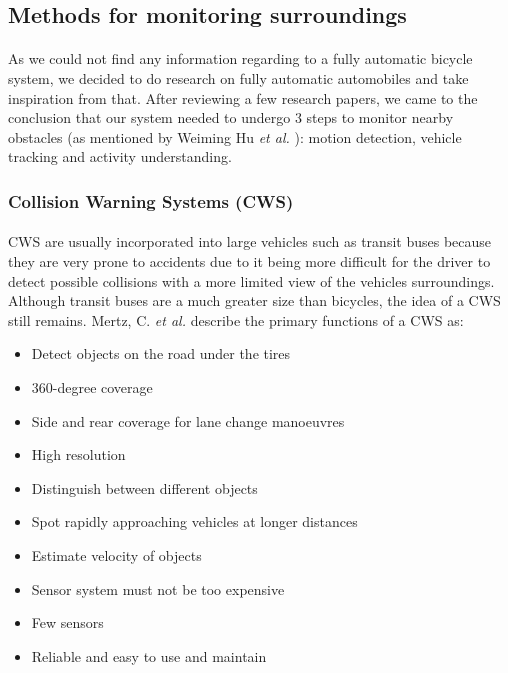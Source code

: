 \documentclass[a4paper]{report}
\begin{document}
\subsection{Methods for monitoring surroundings}
\paragraph{} As we could not find any information regarding to a fully automatic bicycle system, we decided to do research on fully automatic automobiles and take inspiration from that. After reviewing a few research papers, we came to the conclusion that our system needed to undergo 3 steps to monitor nearby obstacles (as mentioned by Weiming Hu \textit{et al.}  \cite{prediction_3D_vehicle_tracking}): motion detection, vehicle tracking and activity understanding.

\subsubsection{Collision Warning Systems (CWS)}
\paragraph{}CWS are usually incorporated into large vehicles such as transit buses because they are very prone to accidents due to it being more difficult for the driver to detect possible collisions with a more limited view of the vehicles surroundings. Although transit buses are a much greater size than bicycles, the idea of a CWS still remains. Mertz, C. \textit{et al.} \cite{CWS_transit_buses} describe the primary functions of a CWS as:
\begin{itemize}
\item Detect objects on the road under the tires
\item 360-degree coverage
\item Side and rear coverage for lane change manoeuvres 
\item High resolution
\item Distinguish between different objects
\item Spot rapidly approaching vehicles at longer distances
\item Estimate velocity of objects
\item Sensor system must not be too expensive
\item Few sensors
\item Reliable and easy to use and maintain
\end{itemize}
\end{document}
